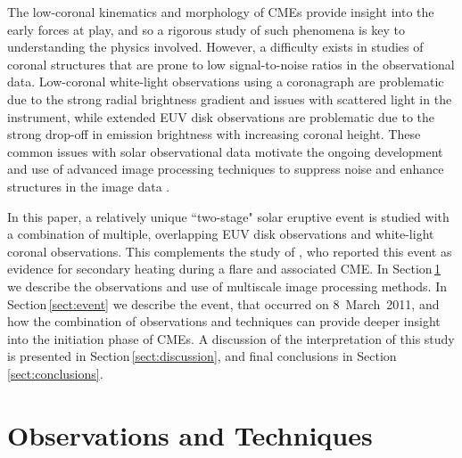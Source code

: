 \documentclass[namedreferences]{solarphysics}
\begin{document}
\begin{article}
The low-coronal kinematics and morphology of CMEs provide insight into the early forces at play, and so a rigorous study of such phenomena is key to understanding the physics involved. However, a difficulty exists in studies of coronal structures that are prone to low signal-to-noise ratios in the observational data. Low-coronal white-light observations using a coronagraph are problematic due to the strong radial brightness gradient and issues with scattered light in the instrument, while extended EUV disk observations are problematic due to the strong drop-off in emission brightness with increasing coronal height. These common issues with solar observational data motivate the ongoing development and use of advanced image processing techniques to suppress noise and enhance structures in the image data \cite{2003A&A...398.1185S,2006SoPh..236..263M,2008SoPh..248..457Y,2011igi-global,2011ApJ...737...88D}. 

In this paper, a relatively unique ``two-stage" solar eruptive event is studied with a combination of multiple, overlapping EUV disk observations and white-light coronal observations. This complements the study of , who reported this event as evidence for secondary heating during a flare and associated CME. In Section\,\ref{sect:techniques} we describe the observations and use of multiscale image processing methods. In Section\,\ref{sect:event} we describe the event, that occurred on 8~March~2011, and how the combination of observations and techniques can provide deeper insight into the initiation phase of CMEs. A discussion of the interpretation of this study is presented in Section\,\ref{sect:discussion}, and final conclusions in Section\,\ref{sect:conclusions}.

\section{Observations and Techniques}
\label{sect:techniques}



\end{article}
\end{document}

